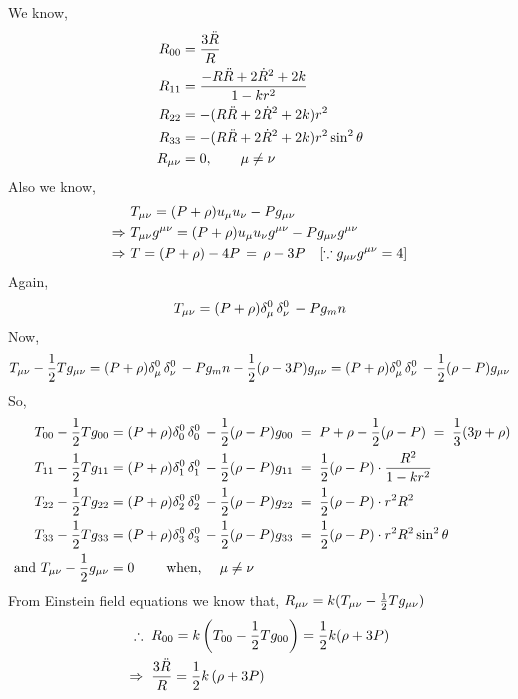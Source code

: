 \documentclass[../main-sheet.tex]{subfiles}
\begin{document}
\begin{soln}
    We know,
    \begin{align*}
        R_{00}&=\frac{3\ddot{R }}{R }\\
        R_{11}&=\frac{-R\ddot{R }+2\dot{R}^2+2k}{1-kr^2 }\\
        R_{22}&=-(R\ddot{R }+2\dot{R}^2+2k)r^2\\
        R_{33}&=-(R\ddot{R }+2\dot{R}^2+2k)r^2\sin^2\theta\\
        R_{{\mu\nu}}&=0,\qquad \mu\neq\nu
    \end{align*}
    Also we know,
    \begin{align*}
        &T_{\mu\nu}=(P+\rho)u_\mu u_\nu-Pg_{\mu\nu}\\
        \Rightarrow\,\,&T_{\mu\nu} g^{\mu\nu}=(P+\rho)u_\mu u_\nu g^{\mu\nu}-Pg_{\mu\nu} g^{\mu\nu}\\
        \Rightarrow\,\,&T=(P+\rho)-4P\,=\,\rho-3P \quad[\because g_{\mu\nu} g^{\mu\nu}=4]
    \end{align*}
    Again, \[T_{\mu\nu}=(P+\rho)\delta_\mu^0\,\delta_\nu^0\,-Pg_mn\]
    Now,
    \[
        T_{\mu\nu} -\frac{1}{2}Tg_{\mu\nu}=(P+\rho)\delta_\mu^0\,\delta_\nu^0\,-Pg_mn -\frac{1}{2}(\rho-3P)g_{\mu\nu} =(P+\rho)\delta_\mu^0\,\delta_\nu^0\,-\frac{1}{2}(\rho-P)g_{\mu\nu}
    \]
    So,
    \begin{align*}
        T_{00}-\frac{1}{2}Tg_{00}&=(P+\rho)\delta_0^0\,\delta_0^0\,-\frac{1}{2}(\rho-P)g_{00}\;=\; P+\rho-\frac{1}{2}(\rho-P )\;=\;\frac{1}{3}(3p+\rho)\\
        T_{11}-\frac{1}{2}Tg_{11}&=(P+\rho)\delta_1^0\,\delta_1^0\,-\frac{1}{2}(\rho-P)g_{11}\;=\; \frac{1}{2}(\rho-P )\cdot\frac{R^2 }{1-kr^2}\\
        T_{22}-\frac{1}{2}Tg_{22}&=(P+\rho)\delta_2^0\,\delta_2^0\,-\frac{1}{2}(\rho-P)g_{22}\;=\; \frac{1}{2}(\rho-P )\cdot r^2{R^2 }\\
        T_{33}-\frac{1}{2}Tg_{33}&=(P+\rho)\delta_3^0\,\delta_3^0\,-\frac{1}{2}(\rho-P)g_{33}\;=\; \frac{1}{2}(\rho-P )\cdot r^2{R^2 }\sin^2\theta\\
        \text{ and }T_{{\mu\nu}}-\frac{1}{2}g_{{\mu\nu}}&=0\qquad\text{ when, }\quad \mu\neq\nu
    \end{align*}
    From Einstein field equations we know that, \(R_{\mu\nu}=k(T_{\mu\nu}-\frac{1}{2}T g_{\mu\nu} )\)
    \begin{align}
        \therefore\;\;& R_{00}=k\left( T_{00}-\frac{1}{2}T g_{00}  \right)=\frac{1}{2} k(\rho+3P)\notag\\
        \Rightarrow\;\;& \frac{3\ddot{R}}{R }=\frac{1}{2}k\left( \rho+3P \right)\notag\\

\end{align}
\end{soln}
\end{document}

